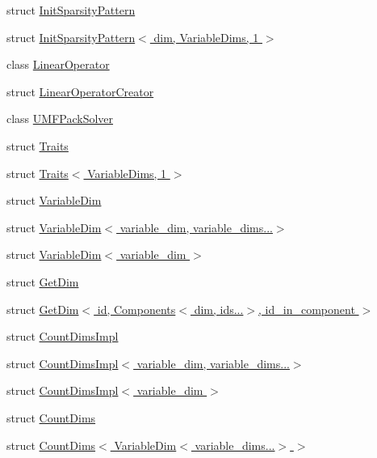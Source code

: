 \begin{DoxyCompactItemize}
struct \hyperlink{structSpacy_1_1dealII_1_1InitSparsityPattern}{Init\-Sparsity\-Pattern}
\item 
struct \hyperlink{structSpacy_1_1dealII_1_1InitSparsityPattern_3_01dim_00_01VariableDims_00_011_01_4}{Init\-Sparsity\-Pattern$<$ dim, Variable\-Dims, 1 $>$}
\item 
class \hyperlink{classSpacy_1_1dealII_1_1LinearOperator}{Linear\-Operator}
\item 
struct \hyperlink{structSpacy_1_1dealII_1_1LinearOperatorCreator}{Linear\-Operator\-Creator}
\item 
class \hyperlink{classSpacy_1_1dealII_1_1UMFPackSolver}{U\-M\-F\-Pack\-Solver}
\item 
struct \hyperlink{structSpacy_1_1dealII_1_1Traits}{Traits}
\item 
struct \hyperlink{structSpacy_1_1dealII_1_1Traits_3_01VariableDims_00_011_01_4}{Traits$<$ Variable\-Dims, 1 $>$}
\item 
struct \hyperlink{structSpacy_1_1dealII_1_1VariableDim}{Variable\-Dim}
\item 
struct \hyperlink{structSpacy_1_1dealII_1_1VariableDim_3_01variable__dim_00_01variable__dims_8_8_8_4}{Variable\-Dim$<$ variable\-\_\-dim, variable\-\_\-dims...$>$}
\item 
struct \hyperlink{structSpacy_1_1dealII_1_1VariableDim_3_01variable__dim_01_4}{Variable\-Dim$<$ variable\-\_\-dim $>$}
\item 
struct \hyperlink{structSpacy_1_1dealII_1_1GetDim}{Get\-Dim}
\item 
struct \hyperlink{structSpacy_1_1dealII_1_1GetDim_3_01id_00_01Components_3_01dim_00_01ids_8_8_8_4_00_01id__in__component_01_4}{Get\-Dim$<$ id, Components$<$ dim, ids...$>$, id\-\_\-in\-\_\-component $>$}
\item 
struct \hyperlink{structSpacy_1_1dealII_1_1CountDimsImpl}{Count\-Dims\-Impl}
\item 
struct \hyperlink{structSpacy_1_1dealII_1_1CountDimsImpl_3_01variable__dim_00_01variable__dims_8_8_8_4}{Count\-Dims\-Impl$<$ variable\-\_\-dim, variable\-\_\-dims...$>$}
\item 
struct \hyperlink{structSpacy_1_1dealII_1_1CountDimsImpl_3_01variable__dim_01_4}{Count\-Dims\-Impl$<$ variable\-\_\-dim $>$}
\item 
struct \hyperlink{structSpacy_1_1dealII_1_1CountDims}{Count\-Dims}
\item 
struct \hyperlink{structSpacy_1_1dealII_1_1CountDims_3_01VariableDim_3_01variable__dims_8_8_8_4_01_4}{Count\-Dims$<$ Variable\-Dim$<$ variable\-\_\-dims...$>$ $>$}

\end{DoxyCompactItemize}
